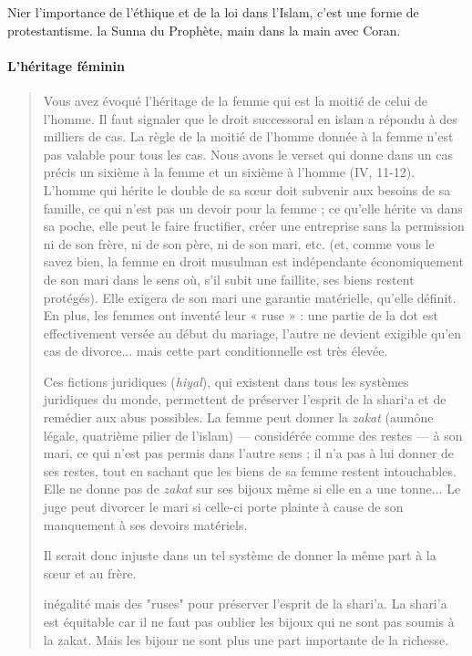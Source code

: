 \begin{Synthesis}
Nier l'importance de l'éthique et de la loi dans l'Islam, c'est une forme de protestantisme. la Sunna du Prophète, main dans la main avec Coran.
\end{Synthesis}

\paragraph{L'héritage féminin}\label{lhuxe9ritage-fuxe9minin}

\begin{quote}
    Vous avez évoqué l'héritage de la femme qui est la moitié de celui de
l'homme. Il faut signaler que le droit successoral en islam a répondu à
des milliers de cas. La règle de la moitié de l'homme donnée à la femme
n'est pas valable pour tous les cas. Nous avons le verset qui donne dans
un cas précis un sixième à la femme et un sixième à l'homme (IV, 11-12).
L'homme qui hérite le double de sa sœur doit subvenir aux besoins de sa
famille, ce qui n'est pas un devoir pour la femme ; ce qu'elle hérite va
dans sa poche, elle peut le faire fructifier, créer une entreprise sans
la permission ni de son frère, ni de son père, ni de son mari, etc. (et,
comme vous le savez bien, la femme en droit musulman est indépendante
économiquement de son mari dans le sens où, s'il subit une faillite, ses
biens restent protégés). Elle exigera de son mari une garantie
matérielle, qu'elle définit. En plus, les femmes ont inventé leur « ruse » : une partie de la dot est effectivement versée au début du mariage,
l'autre ne devient exigible qu'en cas de divorce... mais cette part
conditionnelle est très élevée.

Ces fictions juridiques (\emph{hiyal}), qui existent dans tous les
systèmes juridiques du monde, permettent de préserver l'esprit de la
shari`a et de remédier aux abus possibles. La femme peut donner la
\emph{zakat} (aumône légale, quatrième pilier de l'islam) --- considérée
comme des restes --- à son mari, ce qui n'est pas permis dans l'autre
sens ; il n'a pas à lui donner de ses restes, tout en sachant que les
biens de sa femme restent intouchables. Elle ne donne pas de
\emph{zakat} sur ses bijoux même si elle en a une tonne... Le juge peut
divorcer le mari si celle-ci porte plainte à cause de son manquement à
ses devoirs matériels.

Il serait donc injuste dans un tel système de donner la même part à la
sœur et au frère. 
\begin{Synthesis}
inégalité mais des "ruses" pour préserver l'esprit de la shari'a. La shari'a est équitable car il ne faut pas oublier les bijoux qui ne sont pas soumis à la zakat. Mais les bijour ne sont plus une part importante de la richesse.
\end{Synthesis}


\end{quote}
